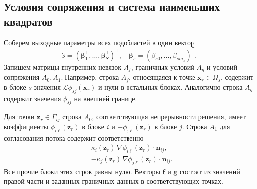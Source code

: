 \documentclass{misisarticle}
\begin{document}
\subsection{Условия сопряжения и система наименьших квадратов}

Соберем выходные параметры всех подобластей в один вектор
\begin{equation}
 \boldsymbol\beta=
 (\boldsymbol\beta_1^{\mathsf T},\ldots,
 \boldsymbol\beta_S^{\mathsf T})^{\mathsf T},
 \quad \boldsymbol\beta_s=(\beta_{s0},\ldots,\beta_{sm_s})^{\mathsf T}.
\label{eq:coeffs}
\end{equation}
Запишем матрицы внутренних невязок $A_f$, граничных условий $A_g$ и условий сопряжения $A_0,A_1$. Например, строка $A_f$, относящаяся к точке $\mathbf{x}_r\in\Omega_s$, содержит в блоке $s$ значения $\mathcal{L}\phi_{sj}(\mathbf{x}_r)$ и нули в остальных блоках. Аналогично строка $A_g$ содержит значения $\phi_{sj}$ на внешней границе.

Для точки $\mathbf z_r\in\Gamma_{ij}$ строка $A_0$, соответствующая непрерывности решения, имеет коэффициенты $\phi_{i\ell}(\mathbf z_r)$ в блоке $i$ и $-\phi_{j\ell}(\mathbf z_r)$ в блоке $j$. Строка $A_1$ для согласования потока содержит соответственно
\begin{equation}
\begin{aligned}
 &\kappa_i(\mathbf z_r)\,
 \nabla\phi_{i\ell}(\mathbf z_r)\!\cdot\!\mathbf n_{ij},\\
 &-\kappa_j(\mathbf z_r)\,
 \nabla\phi_{j\ell}(\mathbf z_r)\!\cdot\!\mathbf n_{ij}.
\end{aligned}
\label{eq:interfaceblocks}
\end{equation}
Все прочие блоки этих строк равны нулю. Векторы $\mathbf f$ и $\mathbf g$ состоят из значений правой части и заданных граничных данных в соответствующих точках.
\end{document}
